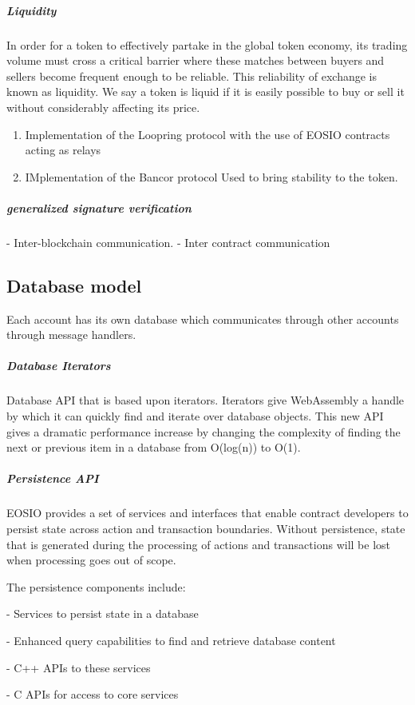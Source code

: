 \documentclass[]{article}
\begin{document}
	\subparagraph{Liquidity}
	In order for a token to effectively partake in the global token
	economy, its trading volume must cross a critical barrier where
	these matches between buyers and sellers become frequent enough to be reliable. This
	reliability of exchange is known as liquidity. We say a token is liquid if it is easily possible
	to buy or sell it without considerably affecting its price.
	
	\begin{enumerate} 
	\item Implementation of the Loopring protocol with the use of EOSIO 
	contracts acting as relays
	\item IMplementation of the Bancor protocol
	Used to bring stability to the token.
	
	\end{enumerate}
	
	\subparagraph{generalized signature verification}
	- Inter-blockchain communication.
	- Inter contract communication
	
	
	\subsection{Database model}
	 Each account has its own database which communicates through other accounts through message handlers.
	 
	
	\subparagraph{Database Iterators}
	Database API that is based upon iterators. Iterators give WebAssembly a handle by which it can quickly find and iterate over database objects. This new API gives a dramatic performance increase by changing the complexity of finding the next or previous item in a database from O(log(n)) to O(1).

	\subparagraph{Persistence API}
	
	EOSIO provides a set of services and interfaces that enable 
	contract developers to persist state across action and transaction 
	boundaries. Without persistence, state that is generated during 
	the processing of actions and transactions will be lost when 
	processing goes out of scope. 
	
	The persistence components include:
	
	- Services to persist state in a database
	
	- Enhanced query capabilities to 
	  find and retrieve database content
	
	- C++ APIs to these services
	
	- C APIs for access to core services
\end{document}
